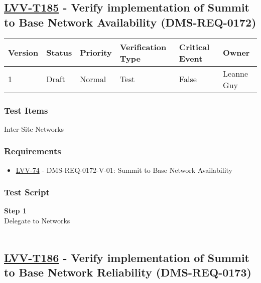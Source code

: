 \hypertarget{lvv-t185---verify-implementation-of-summit-to-base-network-availability-dms-req-0172}{%
\subsection{\texorpdfstring{\href{https://jira.lsstcorp.org/secure/Tests.jspa\#/testCase/LVV-T185}{LVV-T185}
- Verify implementation of Summit to Base Network Availability
(DMS-REQ-0172)}{LVV-T185 - Verify implementation of Summit to Base Network Availability (DMS-REQ-0172)}}\label{lvv-t185---verify-implementation-of-summit-to-base-network-availability-dms-req-0172}}

\begin{longtable}[]{@{}llllll@{}}
\toprule
Version & Status & Priority & Verification Type & Critical Event &
Owner\tabularnewline
\midrule
\endhead
1 & Draft & Normal & Test & False & Leanne Guy\tabularnewline
\bottomrule
\end{longtable}

\hypertarget{test-items-161}{%
\subsubsection{Test Items}\label{test-items-161}}

Inter-Site Networks~

\hypertarget{requirements-162}{%
\subsubsection{Requirements}\label{requirements-162}}

\begin{itemize}
\tightlist
\item
  \href{https://jira.lsstcorp.org/browse/LVV-74}{LVV-74} -
  DMS-REQ-0172-V-01: Summit to Base Network Availability
\end{itemize}

\hypertarget{test-script-162}{%
\subsubsection{Test Script}\label{test-script-162}}

\textbf{Step 1}\\
Delegate to Networks\\
~\\

\hypertarget{lvv-t186---verify-implementation-of-summit-to-base-network-reliability-dms-req-0173}{%
\subsection{\texorpdfstring{\href{https://jira.lsstcorp.org/secure/Tests.jspa\#/testCase/LVV-T186}{LVV-T186}
- Verify implementation of Summit to Base Network Reliability
(DMS-REQ-0173)}{LVV-T186 - Verify implementation of Summit to Base Network Reliability (DMS-REQ-0173)}}\label{lvv-t186---verify-implementation-of-summit-to-base-network-reliability-dms-req-0173}}

